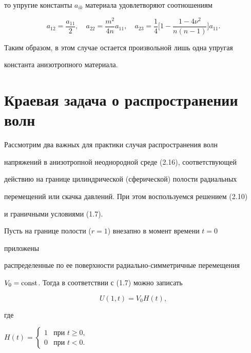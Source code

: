 то упругие константы $a_{ik}$ материала удовлетворяют соотношениям 


$$ 


a_{12}=\frac{a_{11}}{2},\quad a_{22}=\frac{m^2}{4n}a_{11},\quad 


a_{23}=\frac{1}{4}\biggl[1-\frac{1-4\nu^2}{n(n-1)}\biggr]a_{11}.


$$ 


 


Таким образом, в этом случае остается произвольной лишь одна упругая 


константа анизотропного материала. 


 


\section{Краевая задача о распространении волн} 


 


Рассмотрим два важных для практики случая распространения волн 


напряжений в анизотропной неоднородной среде (2.16), соответствующей 


действию на границе цилиндрической (сферической) полости радиальных 


перемещений или скачка давлений. При этом воспользуемся решением (2.10) 


и граничными условиями (1.7). 


 


Пусть на границе полости ($r=1$) внезапно в момент времени $t=0$ 


приложены 


распределенные по ее поверхности радиально-симметричные перемещения 


$V_0=\operatorname{const}$. Тогда в соответствии с (1.7) можно записать 


\begin{equation} 


U(1,t)=V_0H(t), 


\end{equation} 


где 


$H(t)=\begin{cases} 1&\text{при }t\ge 0, \\ 


0&\text{при }t<0.\end{cases}$ 


